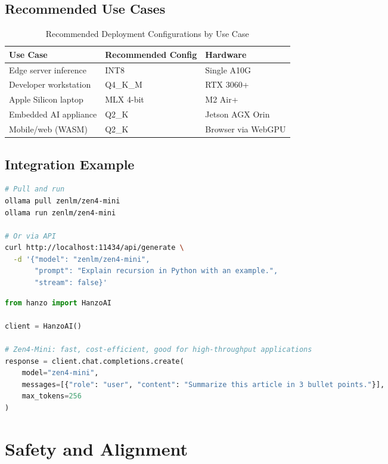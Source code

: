 \documentclass[11pt,a4paper]{article}
\begin{document}
\subsection{Recommended Use Cases}

\begin{table}[H]
\centering
\begin{tabular}{lll}
\toprule
\textbf{Use Case} & \textbf{Recommended Config} & \textbf{Hardware} \\
\midrule
Edge server inference     & INT8        & Single A10G \\
Developer workstation     & Q4\_K\_M    & RTX 3060+ \\
Apple Silicon laptop      & MLX 4-bit   & M2 Air+ \\
Embedded AI appliance     & Q2\_K       & Jetson AGX Orin \\
Mobile/web (WASM)         & Q2\_K       & Browser via WebGPU \\
\bottomrule
\end{tabular}
\caption{Recommended Deployment Configurations by Use Case}
\end{table}

\subsection{Integration Example}

\begin{lstlisting}[language=bash, caption=Running Zen4-Mini with Ollama]
# Pull and run
ollama pull zenlm/zen4-mini
ollama run zenlm/zen4-mini

# Or via API
curl http://localhost:11434/api/generate \
  -d '{"model": "zenlm/zen4-mini",
       "prompt": "Explain recursion in Python with an example.",
       "stream": false}'
\end{lstlisting}

\begin{lstlisting}[language=Python, caption=Zen4-Mini via Hanzo API]
from hanzo import HanzoAI

client = HanzoAI()

# Zen4-Mini: fast, cost-efficient, good for high-throughput applications
response = client.chat.completions.create(
    model="zen4-mini",
    messages=[{"role": "user", "content": "Summarize this article in 3 bullet points."}],
    max_tokens=256
)
\end{lstlisting}

\section{Safety and Alignment}
\end{document}
